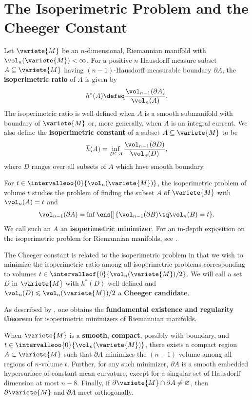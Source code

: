 
\section{The Isoperimetric Problem and the Cheeger Constant {\cite[Sec. 3]{benson_cheeger_2016}}}

Let $\variete{M}$ be an $n$-dimensional, Riemannian manifold with $\vol_n(\variete{M}) < \infty$. For a positive $n$-Hausdorff measure subset $A \subseteq \variete{M}$ having $(n-1)$-Hausdorff measurable boundary $\partial A$, the \textbf{isoperimetric ratio} of $A$ is given by
\begin{equation}
    h^\ast(A) \defeq \frac{\vol_{n-1}(\partial A)}{\vol_n(A)}.
\end{equation}
The isoperimetric ratio is well-defined when $A$ is a smooth submanifold with boundary of $\variete{M}$ or, more generally, when $A$ is an integral current. We also define the \textbf{isoperimetric constant} of a subset $A \subseteq \variete{M}$ to be 
\begin{equation}
\overline{h}(A) = \inf_{D \subseteq A} \frac{\vol_{n-1}(\partial D)}{\vol_n(D)},
\end{equation}
where $D$ ranges over all subsets of $A$ which have smooth boundary. 

For $t \in \intervalleoo{0}{\vol_n(\variete{M})}$, the isoperimetric problem of volume $t$ studies the problem of finding the subset $A$ of $\variete{M}$ with $\vol_n(A) = t$ and
\[
\vol_{n-1}(\partial A) = \inf \ens[\big]{\vol_{n-1}(\partial B) \tq \vol_n(B) = t}.
\]
We call such an $A$ an \textbf{isoperimetric minimizer}. For an in-depth exposition on the isoperimetric problem for Riemannian manifolds, see \cite{ros_isoperimetric_2005}.

The Cheeger constant is related to the isoperimetric problem in that we wish to minimize the isoperimetric ratio among all isoperimetric problems corresponding to volumes $t \in \intervalleof{0}{\vol_n(\variete{M})/2}$. We will call a set $D$ in $\variete{M}$ with $h^\ast(D)$ well-defined and $\vol_n(D) \leqslant \vol_n(\variete{M})/2$ a \textbf{Cheeger candidate}.

As described by \cite{ros_isoperimetric_2005}, one obtains the \textbf{fundamental existence and regularity theorem} for isoperimetric minimizers of Riemannian manifolds.

\begin{theo} \label{theo:fundamental_existence_and_regularity}
    When $\variete{M}$ is a \textbf{smooth}, \textbf{compact}, possibly with boundary, and $t \in \intervalleoo{0}{\vol_n(\variete{M})}$, there exists a compact region $A \subset \variete{M}$ such that $\partial A$ minimizes the $(n-1)$-volume among all regions of $n$-volume $t$. Further, for any such minimizer, $\partial A$ is a smooth embedded hypersurface of constant mean curvature, except for a singular set of Hausdorff dimension at most $n - 8$. Finally, if $\partial \variete{M} \cap \partial A \not= \varnothing$, then $\partial \variete{M}$ and $\partial A$ meet orthogonally.
\end{theo}

